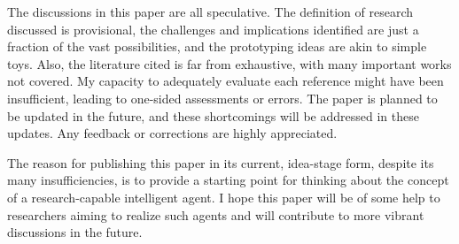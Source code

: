 The discussions in this paper are all speculative. The definition of research discussed is provisional, the challenges and implications identified are just a fraction of the vast possibilities, and the prototyping ideas are akin to simple toys. Also, the literature cited is far from exhaustive, with many important works not covered. My capacity to adequately evaluate each reference might have been insufficient, leading to one-sided assessments or errors. The paper is planned to be updated in the future, and these shortcomings will be addressed in these updates. Any feedback or corrections are highly appreciated.

The reason for publishing this paper in its current, idea-stage form, despite its many insufficiencies, is to provide a starting point for thinking about the concept of a research-capable intelligent agent. I hope this paper will be of some help to researchers aiming to realize such agents and will contribute to more vibrant discussions in the future.



